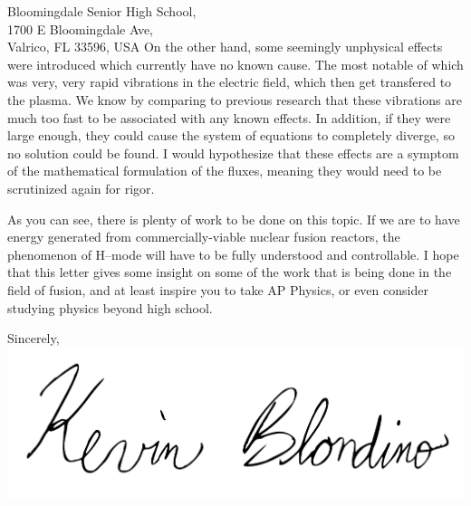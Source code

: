 \documentclass[12pt,a4paper]{letter}
\makeatletter
\renewcommand{\closing}[1]{\par\nobreak\vspace{\parskip}%
	\stopbreaks
		\noindent
	\ifx\@empty\fromaddress\else
		\hspace*{\longindentation}\fi
	\parbox{\indentedwidth}{\raggedright
			\ignorespaces #1\\[1\medskipamount]%
			\ifx\@empty\fromsig
				\fromname
			\else \fromsig \fi\strut}%
		\par}
\makeatother
\begin{document}
\begin{letter}{
	Bloomingdale Senior High School,\\
	1700 E Bloomingdale Ave,\\
	Valrico, FL 33596, USA
}
On the other hand, some seemingly unphysical effects were introduced which currently have no known cause.
The most notable of which was very, very rapid vibrations in the electric field, which then get transfered to the plasma.
We know by comparing to previous research that these vibrations are much too fast to be associated with any known effects.
In addition, if they were large enough, they could cause the system of equations to completely diverge, so no solution could be found.
I would hypothesize that these effects are a symptom of the mathematical formulation of the fluxes, meaning they would need to be scrutinized again for rigor.

As you can see, there is plenty of work to be done on this topic.
If we are to have energy generated from commercially-viable nuclear fusion reactors, the phenomenon of H--mode will have to be fully understood and controllable.
I hope that this letter gives some insight on some of the work that is being done in the field of fusion, and at least inspire you to take AP Physics, or even consider studying physics beyond high school.

\vspace*{10mm}

\closing{Sincerely,
\includegraphics[scale=0.35]{./Signature_Cropped.pdf}
}


\end{letter}
\end{document}
